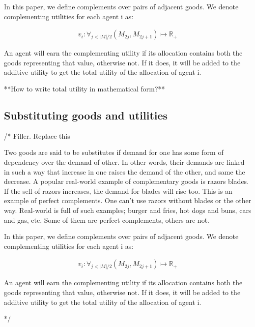In this paper, we define complements over pairs of adjacent goods. We denote complementing utilities for each agent i as: 

\begin{gather}
    v_i: \forall_{j < |M|/2} (M_{2j}, M_{2j+1})\mapsto \mathbb{R_+}
\end{gather}

An agent will earn the complementing utility if its allocation contains both the goods representing that value, otherwise not. If it does, it will be added to the additive utility to get the total utility of the allocation of agent i.

**How to write total utility in mathematical form?**

\subsection{Substituting goods and utilities}
/* Filler. Replace this

Two goods are said to be substitutes if demand for one has some form of dependency over the demand of other. In other words, their demands are linked in such a way that increase in one raises the demand of the other, and same the decrease. A popular real-world example of complementary goods is razors blades. If the sell of razors increases, the demand for blades will rise too. This is an example of perfect complements. One can't use razors without blades or the other way. Real-world is full of such examples; burger and fries, hot dogs and buns, cars and gas, etc. Some of them are perfect complements, others are not.

In this paper, we define complements over pairs of adjacent goods. We denote complementing utilities for each agent i as: 

\begin{gather}
    v_i: \forall_{j < |M|/2} (M_{2j}, M_{2j+1})\mapsto \mathbb{R_+}
\end{gather}

An agent will earn the complementing utility if its allocation contains both the goods representing that value, otherwise not. If it does, it will be added to the additive utility to get the total utility of the allocation of agent i.

*/

